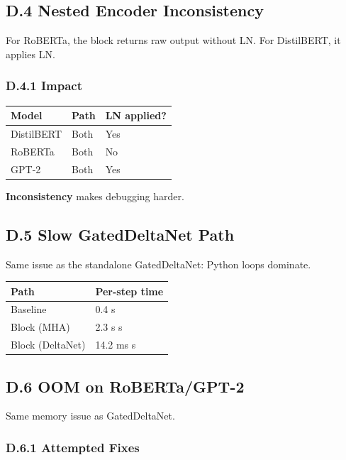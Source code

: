 \subsection{D.4 Nested Encoder Inconsistency}

For RoBERTa, the block returns raw output without LN. For DistilBERT, it 
applies LN.

\subsubsection{D.4.1 Impact}

\begin{table}[H]
\centering
\small
\begin{tabular}{lll}
\toprule
\textbf{Model} & \textbf{Path} & \textbf{LN applied?} \\
\midrule
DistilBERT & Both & Yes \\
RoBERTa & Both & No \\
GPT-2 & Both & Yes \\
\bottomrule
\end{tabular}
\end{table}

\textbf{Inconsistency} makes debugging harder.

\subsection{D.5 Slow GatedDeltaNet Path}

Same issue as the standalone GatedDeltaNet: Python loops dominate.

\begin{table}[H]
\centering
\small
\begin{tabular}{ll}
\toprule
\textbf{Path} & \textbf{Per-step time} \\
\midrule
Baseline & 0.4 s \\
Block (MHA) & 2.3 s s \\
Block (DeltaNet) & 14.2 ms s \\
\bottomrule
\end{tabular}
\end{table}

\subsection{D.6 OOM on RoBERTa/GPT-2}

Same memory issue as GatedDeltaNet.

\subsubsection{D.6.1 Attempted Fixes}

